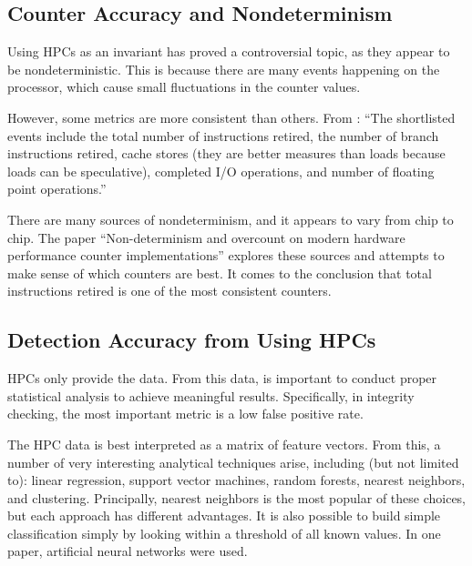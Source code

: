 \documentclass[notitlepage]{article}
\begin{document}
\subsection{Counter Accuracy and Nondeterminism}
Using HPCs as an invariant has proved a controversial topic, as they appear to
be nondeterministic. This is because there are many events happening on the
processor, which cause small fluctuations in the counter values.

However, some metrics are more consistent than others. From \cite{arehardware}:
``The shortlisted events include the total number of instructions retired, the
number of branch instructions retired, cache stores (they are better measures
than loads because loads can be speculative), completed I/O operations, and
number of floating point operations.''\cite{arehardware}

There are many sources of nondeterminism, and it appears to vary from chip to
chip. The paper ``Non-determinism and overcount on modern hardware performance
counter implementations'' explores these sources and attempts to make sense of
which counters are best. It comes to the conclusion that total instructions
retired is one of the most consistent counters\cite{overcount}.

\subsection{Detection Accuracy from Using HPCs}
HPCs only provide the data. From this data, is important to conduct proper
statistical analysis to achieve meaningful results. Specifically, in integrity
checking, the most important metric is a low false positive rate.

The HPC data is best interpreted as a matrix of feature vectors.  From this, a
number of very interesting analytical techniques arise, including (but not
limited to): linear regression, support vector machines, random forests, nearest
neighbors, and clustering. Principally, nearest neighbors is the most popular of
these choices, but each approach has different advantages\cite{forsyth}. It is
also possible to build simple classification simply by looking within a
threshold of all known values\cite{numchecker}. In one paper, artificial neural
networks were used\cite{feasibility}.
\end{document}

